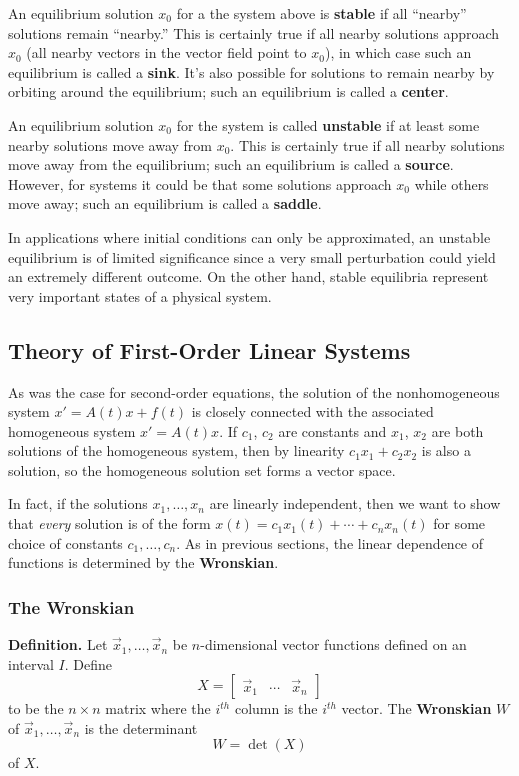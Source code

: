 \documentclass[12pt]{article}
\begin{document}
An equilibrium solution $x_0$ for a the system above is \textbf{stable} if all ``nearby'' solutions remain ``nearby.'' This is certainly true if all nearby solutions approach $x_0$ (all nearby vectors in the vector field point to $x_0$), in which case such an equilibrium is called a \textbf{sink}. It's also possible for solutions to remain nearby by orbiting around the equilibrium; such an equilibrium is called a \textbf{center}.

An equilibrium solution $x_0$ for the system is called \textbf{unstable} if at least some nearby solutions move away from $x_0$. This is certainly true if all nearby solutions move away from the equilibrium; such an equilibrium is called a \textbf{source}. However, for systems it could be that some solutions approach $x_0$ while others move away; such an equilibrium is called a \textbf{saddle}.

In applications where initial conditions can only be approximated, an unstable equilibrium is of limited significance since a very small perturbation could yield an extremely different outcome. On the other hand, stable equilibria represent very important states of a physical system.

\subsection{Theory of First-Order Linear Systems}

As was the case for second-order equations, the solution of the nonhomogeneous system $x' = A(t)x + f(t)$ is closely connected with the associated homogeneous system $x' = A(t)x$. If $c_1$, $c_2$ are constants and $x_1$, $x_2$ are both solutions of the homogeneous system, then by linearity $c_1x_1 + c_2x_2$ is also a solution, so the homogeneous solution set forms a vector space.

In fact, if the solutions $x_1, \ldots, x_n$ are linearly independent, then we want to show that \textit{every} solution is of the form $x(t) = c_1x_1(t) + \cdots + c_nx_n(t)$ for some choice of constants $c_1, \ldots, c_n$. As in previous sections, the linear dependence of functions is determined by the \textbf{Wronskian}.

\subsubsection{The Wronskian}

\textbf{Definition.} Let $\vec{x}_1, \ldots, \vec{x}_n$ be $n$-dimensional vector functions defined on an interval $I$. Define $$X = \begin{bmatrix} \vec{x}_1 & \cdots & \vec{x}_n \end{bmatrix}$$ to be the $n \times n$ matrix where the $i^{th}$ column is the $i^{th}$ vector. The \textbf{Wronskian} $W$ of $\vec{x}_1, \ldots, \vec{x}_n$ is the determinant $$W = \det(X)$$ of $X$.
\end{document}
